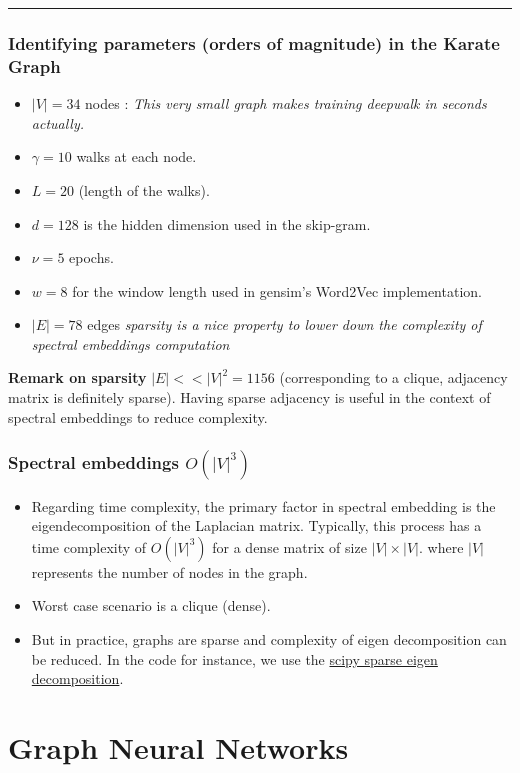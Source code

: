 \documentclass[a4paper]{article}
\begin{document}
\hrule
\subsubsection*{Identifying parameters (orders of magnitude) in the Karate Graph}
\begin{itemize}
    \item $|V| = 34$ nodes : \textit{This very small graph makes training deepwalk in seconds actually.}
    \item $\gamma = 10$ walks at each node.
    \item $L=20$ (length of the walks).
    \item $d=128$ is the hidden dimension used in the skip-gram.
    \item $\nu=5$ epochs.
    \item $w=8$ for the window length used in gensim's Word2Vec implementation.
    \item $|E| = 78$ edges \textit{sparsity is a nice property to lower down the complexity of spectral embeddings computation}
\end{itemize}

\textbf{Remark on sparsity}  $|E| << |V|^2 = 1156$ (corresponding to a clique, adjacency matrix is definitely sparse). Having sparse adjacency is useful in the context of spectral embeddings to reduce complexity.


\subsubsection*{Spectral embeddings $O(|V|^{3})$}
\begin{itemize}
\item  Regarding time complexity, the primary factor in spectral embedding is the eigendecomposition of the Laplacian matrix. 
Typically, this process has a time complexity of $O(|V|^3)$ for a dense matrix of size $|V| \times |V|$.
where $ |V| $ represents the number of nodes in the graph.
\item  Worst case scenario is a clique (dense).
\item But in practice, graphs are sparse and complexity of eigen decomposition can be reduced.
In the code for instance, 
we use the \href{https://docs.scipy.org/doc/scipy/reference/generated/scipy.sparse.linalg.eigs.html}{scipy sparse eigen decomposition}.
\end{itemize}
\break

\section{Graph Neural Networks}
\end{document}
